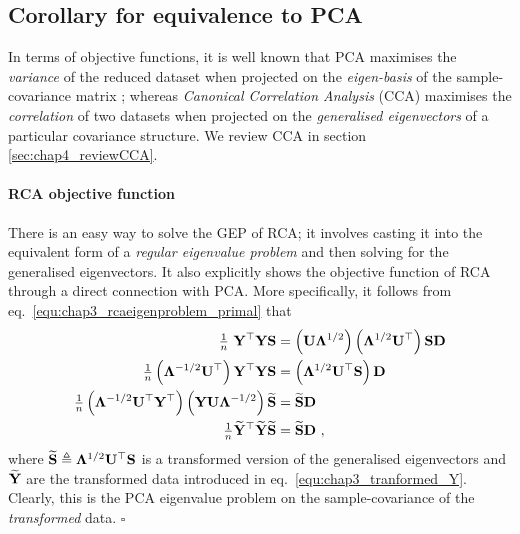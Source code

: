 
    \subsection{Corollary for equivalence to PCA} \label{subsec:chap3_PCA_equiv}
    
      In terms of objective functions, it is well known that PCA maximises the \emph{variance} of the reduced dataset when projected on the \emph{eigen-basis} of the sample-covariance matrix \citep{Jolliffe:pca02, Hastie:elements09, Bishop:book06}; whereas \textit{Canonical Correlation Analysis} (CCA) maximises the \textit{correlation} of two datasets when projected on the \emph{generalised eigenvectors} of a particular covariance structure.
      We review CCA in section \ref{sec:chap4_reviewCCA}.

      \paragraph{RCA objective function}
      There is an easy way to solve the GEP of RCA; it involves casting it into the equivalent form of a \textit{regular eigenvalue problem} and then solving for the generalised eigenvectors.
      It also explicitly shows the objective function of RCA through a direct connection with PCA.
      More specifically, it follows from eq.~\eqref{equ:chap3_rcaeigenproblem_primal} that
      \begin{align} \label{equ:chap3_RCA_to_PCA}
	\begin{split}
	  \tfrac{1}{n} ~ \mathbf{Y}^\top  \mathbf{Y} \mathbf{S} &= \left( \mathbf{U} \mathbf{\Lambda}^{1/2} \right)  \left( \mathbf{\Lambda}^{1/2} \mathbf{U}^\top \right) \mathbf{S}  \mathbf{D} \\
	  \tfrac{1}{n} \left( \mathbf{\Lambda}^{-1/2} \mathbf{U}^\top \right) \mathbf{Y}^\top  \mathbf{Y} \mathbf{S} &= \left( \mathbf{\Lambda}^{1/2} \mathbf{U}^\top \mathbf{S} \right) \mathbf{D} \\
	  \tfrac{1}{n} \left( \mathbf{\Lambda}^{-1/2} \mathbf{U}^\top \mathbf{Y}^\top \right) \left( \mathbf{Y} \mathbf{U} \mathbf{\Lambda}^{-1/2} \right) \widetilde{\mathbf{S}} &= \widetilde{\mathbf{S}} \mathbf{D} \\
	  \tfrac{1}{n} \widetilde{\mathbf{Y}}^\top \widetilde{\mathbf{Y}} \widetilde{\mathbf{S}} &= \widetilde{\mathbf{S}} \mathbf{D} ~,
	\end{split}
      \end{align}
      where $\widetilde{\mathbf{S}} \triangleq \mathbf{\Lambda}^{1/2} \mathbf{U}^\top \mathbf{S}$ is a transformed version of the generalised eigenvectors and $\widetilde{\mathbf{Y}}$ are the transformed data introduced in eq.~\eqref{equ:chap3_tranformed_Y}.
      Clearly, this is the PCA eigenvalue problem on the sample-covariance of the \emph{transformed} data.
      \hspace*{\fill} $\square$

